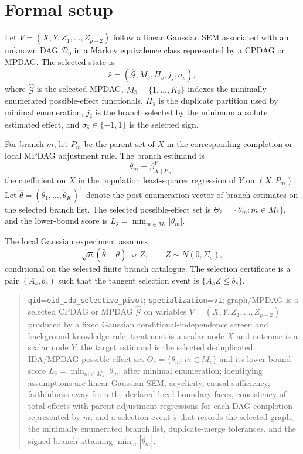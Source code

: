 \documentclass[11pt]{article}
\newcommand{\transpose}{\mathsf{T}}
\theoremstyle{definition}
\theoremstyle{plain}
\theoremstyle{remark}
\begin{document}
\section{Formal setup}
Let $V=(X,Y,Z_1,\ldots,Z_{p-2})$ follow a linear Gaussian SEM associated with an unknown DAG $\mathcal D_0$ in a Markov equivalence class represented by a CPDAG or MPDAG. The selected state is
\[
\widehat s=(\widehat{\mathcal G},M_{\widehat s},\Pi_{\widehat s},j_{\widehat s},\sigma_{\widehat s}),
\]
where $\widehat{\mathcal G}$ is the selected MPDAG, $M_{\widehat s}=\{1,\ldots,K_{\widehat s}\}$ indexes the minimally enumerated possible-effect functionals, $\Pi_{\widehat s}$ is the duplicate partition used by minimal enumeration, $j_{\widehat s}$ is the branch selected by the minimum absolute estimated effect, and $\sigma_{\widehat s}\in\{-1,1\}$ is the selected sign.

For branch $m$, let $P_m$ be the parent set of $X$ in the corresponding completion or local MPDAG adjustment rule. The branch estimand is
\[
\theta_m=\beta_{X\mid P_m}^{Y},
\]
the coefficient on $X$ in the population least-squares regression of $Y$ on $(X,P_m)$. Let $\widehat\theta=(\widehat\theta_1,\ldots,\widehat\theta_K)^\transpose$ denote the post-enumeration vector of branch estimates on the selected branch list. The selected possible-effect set is $\Theta_{\widehat s}=\{\theta_m:m\in M_{\widehat s}\}$, and the lower-bound score is $L_{\widehat s}=\min_{m\in M_{\widehat s}}|\theta_m|$.

The local Gaussian experiment assumes
\[
\sqrt n(\widehat\theta-\theta)\rightsquigarrow Z,\qquad Z\sim N(0,\Sigma_s),
\]
conditional on the selected finite branch catalogue. The selection certificate is a pair $(A_s,b_s)$ such that the tangent selection event is $\{A_s Z\le b_s\}$.

\begin{quote}
\texttt{qid}=\texttt{eid\_ida\_selective\_pivot}; \texttt{specialization}=\texttt{v1}; graph/MPDAG is a selected CPDAG or MPDAG $\widehat{\mathcal G}$ on variables $V=(X,Y,Z_1,\ldots,Z_{p-2})$ produced by a fixed Gaussian conditional-independence screen and background-knowledge rule; treatment is a scalar node $X$ and outcome is a scalar node $Y$; the target estimand is the selected deduplicated IDA/MPDAG possible-effect set $\Theta_{\widehat s}=\{\theta_m:m\in M_{\widehat s}\}$ and its lower-bound score $L_{\widehat s}=\min_{m\in M_{\widehat s}}|\theta_m|$ after minimal enumeration; identifying assumptions are linear Gaussian SEM, acyclicity, causal sufficiency, faithfulness away from the declared local-boundary faces, consistency of total effects with parent-adjustment regressions for each DAG completion represented by $m$, and a selection event $\widehat s$ that records the selected graph, the minimally enumerated branch list, duplicate-merge tolerances, and the signed branch attaining $\min_m|\widehat\theta_m|$.
\end{quote}
\end{document}
